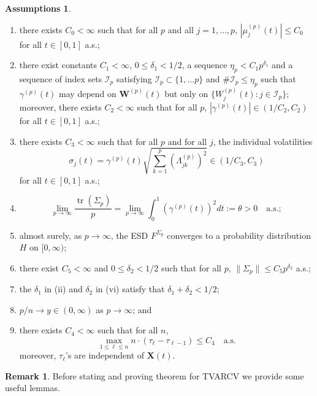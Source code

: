 \documentclass[a4paper,11pt]{article}
\theoremstyle{plain}
\theoremstyle{definition}
\newtheorem{rmrk}[thm]{Remark}
\newtheorem{asmp}[thm]{Assumptions}
\newcommand{\tr}{\operatorname{tr}}
\begin{document}
    \begin{asmp} \label{asmp2} \
    	\begin{enumerate}
    		\item there exists $C_0 < \infty$ such that for all $p$ and all $j = 1, \dots, p$, $|\mu_j^{(p)}(t)| \leq C_0$ for all $t \in [0, 1]$ a.s.;
    		\item there exist constants $C_1 < \infty$, $0 \leq \delta_1 < 1/2$, a sequence $\eta_p < C_1 p^{\delta_1}$ and a sequence of index sets $\mathcal{I}_p$ satisfying $\mathcal{I}_p \subset \{ 1, \dots p \}$ and $\# \mathcal{I}_p \leq \eta_p$ such that $\gamma^{(p)}(t)$ may depend on $\mathbf{W}^{(p)}(t)$ but only on $\{ W_j^{(p)}(t) : j \in \mathcal{I}_p \}$; moreover, there exists $C_2 < \infty$ such that for all $p$, $|\gamma^{(p)}(t)| \in (1/C_2, C_2)$ for all $t \in [0, 1]$ a.s.;
    		\item there exists $C_3 < \infty$ such that for all $p$ and for all $j$, the individual volatilities \[ \sigma_j(t) = \gamma^{(p)}(t)\sqrt{\sum_{k=1}^{p} (\Lambda_{jk}^{(p)})^2} \in (1/C_3, C_3)\] for all $t \in [0, 1]$ a.s.;
    		\item \[ \lim_{p \rightarrow \infty} \frac{\tr(\Sigma_p)}{p} = \lim_{p \rightarrow \infty} \int_{0}^{1} (\gamma^{(p)}(t))^2 dt := \theta > 0 \quad \text{a.s.}; \]
    		\item almost surely, as $p \rightarrow \infty$, the ESD $F^{\Sigma_p}$ converges to a probability distribution $H$ on $[0, \infty)$;
    		\item there exist $C_5 < \infty$ and $0 \leq \delta_2 < 1/2$ such that for all $p$, $\| \Sigma_p \| \leq C_5 p^{\delta_2}$ a.s.;
    		\item the $\delta_1$ in (ii) and $\delta_2$ in (vi) satisfy that $\delta_1 + \delta_2 < 1/2$;
    		\item $p/n \rightarrow y \in (0, \infty) $ as $p \rightarrow \infty$; and
    		\item there exists $C_4 < \infty$ such that for all $n$,
    		\[ \max_{1 \leq \ell \leq n} n \cdot (\tau_{\ell} - \tau_{\ell - 1}) \leq C_4 \quad \text{a.s.}  \]
    		moreover, $\tau_{\ell}$'s are independent of $\mathbf{X}(t)$.
    	\end{enumerate}
    \end{asmp}
    
    \begin{rmrk}
    	Before stating and proving theorem for TVARCV we provide some useful lemmas.
    \end{rmrk}
    
\end{document}
